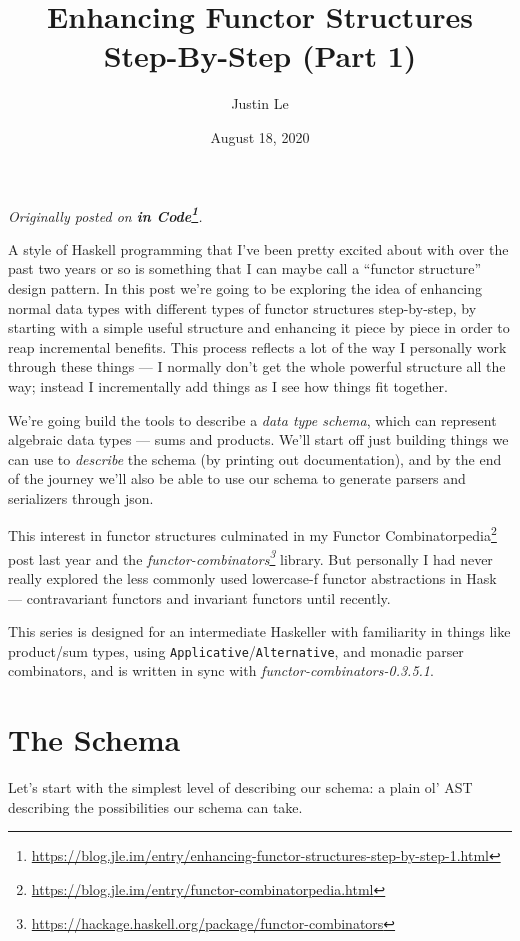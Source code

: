 \documentclass[]{article}
\title{Enhancing Functor Structures Step-By-Step (Part 1)}
\author{Justin Le}
\date{August 18, 2020}
\renewcommand{\href}[2]{#2\footnote{\url{#1}}}
\begin{document}
\maketitle

\emph{Originally posted on
\textbf{\href{https://blog.jle.im/entry/enhancing-functor-structures-step-by-step-1.html}{in
Code}}.}

A style of Haskell programming that I've been pretty excited about with over the
past two years or so is something that I can maybe call a ``functor structure''
design pattern. In this post we're going to be exploring the idea of enhancing
normal data types with different types of functor structures step-by-step, by
starting with a simple useful structure and enhancing it piece by piece in order
to reap incremental benefits. This process reflects a lot of the way I
personally work through these things --- I normally don't get the whole powerful
structure all the way; instead I incrementally add things as I see how things
fit together.

We're going build the tools to describe a \emph{data type schema}, which can
represent algebraic data types --- sums and products. We'll start off just
building things we can use to \emph{describe} the schema (by printing out
documentation), and by the end of the journey we'll also be able to use our
schema to generate parsers and serializers through json.

This interest in functor structures culminated in my
\href{https://blog.jle.im/entry/functor-combinatorpedia.html}{Functor
Combinatorpedia} post last year and the
\emph{\href{https://hackage.haskell.org/package/functor-combinators}{functor-combinators}}
library. But personally I had never really explored the less commonly used
lowercase-f functor abstractions in Hask --- contravariant functors and
invariant functors until recently.

This series is designed for an intermediate Haskeller with familiarity in things
like product/sum types, using \texttt{Applicative}/\texttt{Alternative}, and
monadic parser combinators, and is written in sync with
\emph{functor-combinators-0.3.5.1}.

\hypertarget{the-schema}{%
\section{The Schema}\label{the-schema}}

Let's start with the simplest level of describing our schema: a plain ol' AST
describing the possibilities our schema can take.
\end{document}
